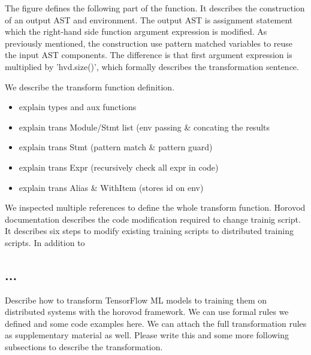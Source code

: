 The figure defines the following part of the function.
It describes the construction of an output AST and environment.
The output AST is assignment statement which
the right-hand side function argument expression is modified.
As previously mentioned, the construction use pattern matched variables
to reuse the input AST components.
The difference is that first argument expression is multiplied by 'hvd.size()',
which formally describes the transformation sentence.

We describe the transform function definition.
\begin{itemize}
  \item explain types and aux functions
  \item explain trans Module/Stmt list (env passing \& concating the results
  \item explain trans Stmt (pattern match \& pattern guard)
  \item explain trans Expr (recursively check all expr in code)
  \item explain trans Alias \& WithItem (stores id on env)
\end{itemize}

We inspected multiple references to define the whole transform function.
Horovod documentation\cite{horovodtf} describes the code modification
required to change trainig script. It describes six steps to modify
existing training scripts to distributed training scripts. 
In addition to 

\subsection{...}
Describe how to transform TensorFlow ML models to training them on distributed
systems with the horovod framework. We can use formal rules we defined and some
code examples here. We can attach the full transformation rules as
supplementary material as well.  Please write this and some more following
subsections to describe the transformation.
